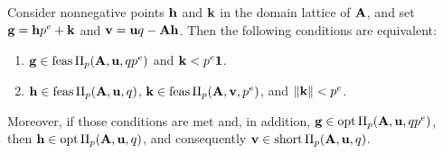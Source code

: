\documentclass{article}
\begin{document}
\begin{lemma}
   \label{general AIP prep: L}
   Consider nonnegative points $\mathbf{h}$ and $\mathbf{k}$ in the domain lattice of $\mathbf{A}$, and set $\mathbf{g} = \mathbf{h} p^e + \mathbf{k}$ and $\mathbf{v} = \mathbf{u}q - \mathbf{A}\mathbf{h}$.
   Then the following conditions are equivalent\textup:
   \begin{enumerate}[$(1)$]
      \item $\mathbf{g} \in \operatorname{feas} \Pi_p(\mathbf{A},\mathbf{u},qp^e)$ and $\mathbf{k} < p^e \mathbf{1}$.
      \item $\mathbf{h} \in \operatorname{feas} \Pi_p(\mathbf{A},\mathbf{u},q)$, $\mathbf{k} \in \operatorname{feas} \Pi_p(\mathbf{A},\mathbf{v},p^e)$, and $\| \mathbf{k} \| < p^e$.
   \end{enumerate}
   Moreover, if those conditions are met and, in addition, $\mathbf{g}\in \operatorname{opt} \Pi_p(\mathbf{A},\mathbf{u},qp^e)$, then $\mathbf{h} \in \operatorname{opt} \Pi_p(\mathbf{A},\mathbf{u},q)$, and consequently $\mathbf{v} \in \operatorname{short} \Pi_p(\mathbf{A},\mathbf{u},q)$.
\end{lemma}
\end{document}
